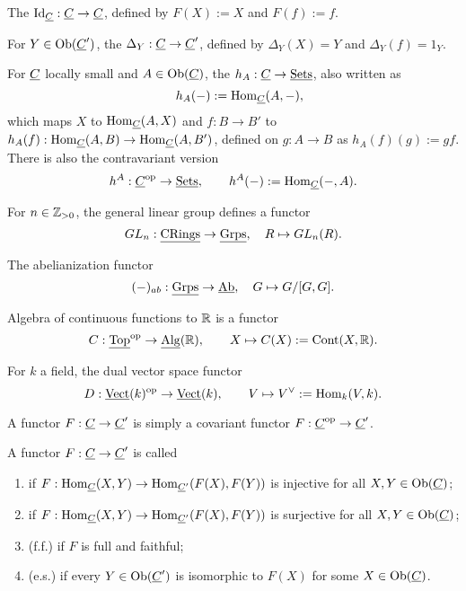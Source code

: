 \begin{examples*}
	\item The  \( \mathrm{Id}_{\underline{C}}: \underline{C} \to \underline{C} \), defined by \( F(X) := X \) and \( F(f) := f \).
	\item For \( Y \in \operatorname{Ob}(\underline{C}') \), the  \( \Delta_Y: \underline{C} \to \underline{C}' \), defined by \( \Delta_Y(X) = Y \) and \( \Delta_Y(f) = 1_Y \).

	\item For \( \underline{C} \) locally small and \( A \in \operatorname{Ob}(\underline{C}) \), the  \( h_A: \underline{C} \to \underline{\mathrm{Sets}} \), also written as
		\[
			\quad h_A(-) := \operatorname{Hom}_{\underline{C}}(A, -),
		\]
		which maps \( X \) to \( \operatorname{Hom}_{\underline{C}}(A, X) \) and \( f: B \to B' \) to \( h_A(f): \operatorname{Hom}_{\underline{C}}(A, B) \to \operatorname{Hom}_{\underline{C}}(A, B') \), defined on \( g: A \to B \) as \( h_A(f)(g) := g f \). There is also the contravariant version
		\[
			h^A: \underline{C}^\mathrm{op} \to \underline{\mathrm{Sets}}, \qquad h^A(-) := \operatorname{Hom}_{\underline{C}}(-, A).
		\]

	\item For \( n \in \mathbb{Z}_{> 0} \), the general linear group defines a functor
		\[
			GL_n: \underline{\mathrm{CRings}} \to \underline{\mathrm{Grps}}, \quad R \mapsto GL_n(R).
		\]

	\item The abelianization functor
		\[
			(-)_{ab}: \underline{\mathrm{Grps}} \to \underline{\mathrm{Ab}}, \quad G \mapsto G/[G, G].
		\]

	\item Algebra of continuous functions to \( \mathbb{R} \) is a functor
		\[
			C: \underline{\mathrm{Top}}^\mathrm{op} \to \operatorname{\underline{\mathrm{Alg}}}(\mathbb{R}), \qquad X \mapsto C(X) := \mathrm{Cont}(X, \mathbb{R}).
		\]

	\item For \( k \) a field, the dual vector space functor
		\[
			D: \operatorname{\underline{\mathrm{Vect}}}(k)^\mathrm{op} \to \operatorname{\underline{\mathrm{Vect}}}(k), \qquad V \mapsto V^{\vee} := \operatorname{Hom}_k(V, k).
		\]
\end{examples*}

\begin{definition*}
	A  functor \( F: \underline{C} \to \underline{C}' \) is simply a covariant functor \( F: \underline{C}^\mathrm{op} \to \underline{C}' \).
\end{definition*}

\begin{definition*}
	A functor \( F: \underline{C} \to \underline{C}' \) is called
	\begin{enumerate}
		\item {} if \( F: \operatorname{Hom}_{\underline{C}}(X, Y) \to \operatorname{Hom}_{\underline{C}'}(F(X), F(Y)) \) is injective for all \( X, Y \in \operatorname{Ob}(\underline{C}) \);
		\item {} if \( F: \operatorname{Hom}_{\underline{C}}(X, Y) \to \operatorname{Hom}_{\underline{C}'}(F(X), F(Y)) \) is surjective for all \( X, Y \in \operatorname{Ob}(\underline{C}) \);
		\item {} (f.f.) if \( F \) is full and faithful;
		\item {} (e.s.) if every \( Y \in \operatorname{Ob}(\underline{C}') \) is isomorphic to \( F(X) \) for some \( X \in \operatorname{Ob}(\underline{C}) \).
	\end{enumerate}
\end{definition*}

